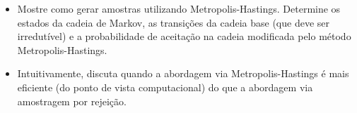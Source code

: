 \begin{itemize}
  \item Mostre como gerar amostras utilizando Metropolis-Hastings. Determine os estados da cadeia de Markov, as transições da cadeia base (que deve ser irredutível) e a probabilidade de aceitação na cadeia modificada pelo método Metropolis-Hastings.
  \begin{resposta}
  \end{resposta}
  \item Intuitivamente, discuta quando a abordagem via Metropolis-Hastings é mais eficiente (do ponto de vista computacional) do que a abordagem via amostragem por rejeição.
  \begin{resposta}
  \end{resposta}
\end{itemize}


